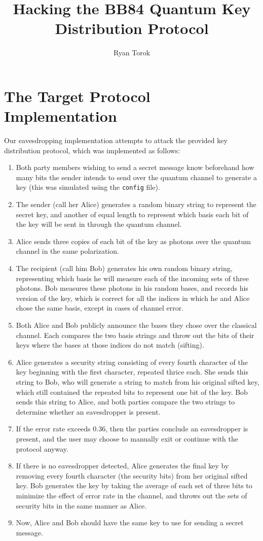 \documentclass{article}
\title{Hacking the BB84 Quantum Key Distribution Protocol}
\author{Ryan Torok}
\begin{document}
\maketitle
\section {The Target Protocol Implementation}
Our eavesdropping implementation attempts to attack the provided key distribution protocol, which was implemented as follows:
\begin{enumerate}
\item Both party members wishing to send a secret message know beforehand how many bits the sender intends to send over the quantum channel to generate a key (this was simulated using the \texttt{config} file).
\item The sender (call her Alice) generates a random binary string to represent the secret key, and another of equal length to represent which basis each bit of the key will be sent in through the quantum channel.
\item Alice sends three copies of each bit of the key as photons over the quantum channel in the same polarization.
\item The recipient (call him Bob) generates his own random binary string, representing which basis he will measure each of the incoming sets of three photons. Bob measures these photons in his random bases, and records his version of the key, which is correct for all the indices in which he and Alice chose the same basis, except in cases of channel error.
\item Both Alice and Bob publicly announce the bases they chose over the classical channel. Each compares the two basis strings and throw out the bits of their keys where the bases at those indices do not match (sifting).
\item Alice generates a security string consisting of every fourth character of the key beginning with the first character, repeated thrice each. She sends this string to Bob, who will generate a string to match from his original sifted key, which still contained the repeated bits to represent one bit of the key. Bob sends this string to Alice, and both parties compare the two strings to determine whether an eavesdropper is present.
\item If the error rate exceeds 0.36, then the parties conclude an eavesdropper is present, and the user may choose to manually exit or continue with the protocol anyway.
\item If there is no eavesdropper detected, Alice generates the final key by removing every fourth character (the security bits) from her original sifted key. Bob generates the key by taking the average of each set of three bits to minimize the effect of error rate in the channel, and throws out the sets of security bits in the same manner as Alice.
\item Now, Alice and Bob should have the same key to use for sending a secret message.
\end{enumerate}
\end{document}

